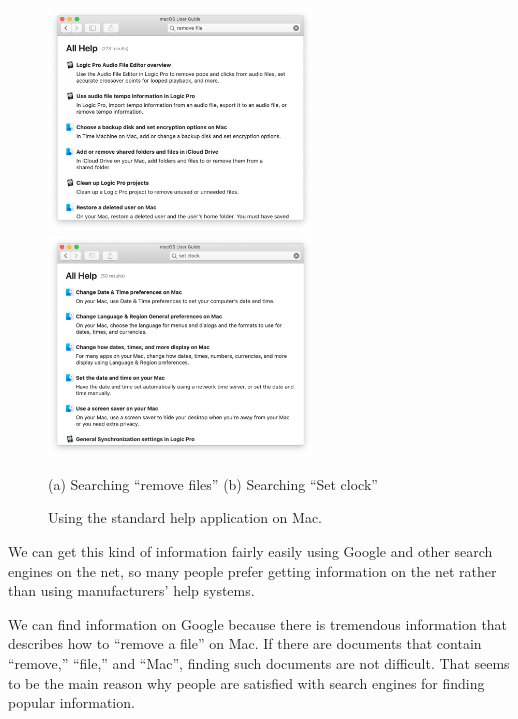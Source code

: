 \documentclass[manuscript,anonymous,review]{acmart}
\begin{document}
\begin{figure}[H]
  \includegraphics[width=7cm,bb=-50 0 950 800]{figures/eaa80e41ddc3d3620fae133007274573.png}
  \includegraphics[width=7cm,bb=-50 0 950 800]{figures/0cd679128d8f69eb2a8a966d6466a8a4.png}
  \par
  (a) Searching ``remove files'' \hspace{3cm} (b) Searching ``Set clock''
  \caption{Using the standard help application on Mac.}
  \label{machelp}
\end{figure}


We can get this kind of information fairly easily using Google and
other search engines on the net, so many people prefer getting
information on the net rather than using manufacturers' help systems.

We can find information on Google because there is tremendous information
that describes how to ``remove a file'' on Mac.
If there are documents that contain ``remove,'' ``file,'' and ``Mac'',
finding such documents are not difficult.
That seems to be the main reason why people are satisfied with search engines
for finding popular information.
\end{document}
